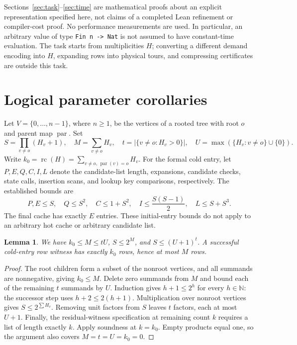 \documentclass[11pt,a4paper]{article}
\newtheorem{lemma}[theorem]{Lemma}
\theoremstyle{definition}
\theoremstyle{remark}
\newcommand{\NN}{\mathbb N}
\newcommand{\pa}{\operatorname{par}}
\newcommand{\RC}{\operatorname{rc}}
\begin{document}
Sections~\ref{sec:task}--\ref{sec:time} are mathematical proofs about an
explicit representation specified here, not claims of a completed Lean
refinement or compiler-cost proof. No performance measurements are used.
In particular, an arbitrary value of type \texttt{Fin n -> Nat} is not
assumed to have constant-time evaluation. The task starts from multiplicities
\(H\); converting a different demand encoding into \(H\), expanding rows
into physical tours, and compressing certificates are outside this task.

\section{Logical parameter corollaries}
Let \(V=\{0,\ldots,n-1\}\), where \(n\ge1\), be the vertices of a rooted
tree with root \(o\) and parent map \(\pa\). Set
\[
 S=\prod_{v\ne o}(H_v+1),\quad M=\sum_{v\ne o}H_v,\quad
 t=|\{v\ne o:H_v>0\}|,\quad
 U=\max(\{H_v:v\ne o\}\cup\{0\}).
\]
Write \(k_0=\RC(H)=\sum_{v\ne o,\,\pa(v)=o}H_v\).
For the formal cold entry, let \(P,E,Q,C,I,L\) denote the candidate-list
length, expansions, candidate checks, state calls, insertion scans, and lookup
key comparisons, respectively. The established bounds are
\begin{equation}\label{eq:logical}
 P,E\le S,\quad Q\le S^2,\quad C\le1+S^2,\quad
 I\le\frac{S(S-1)}2,\quad L\le S+S^3.
\end{equation}
The final cache has exactly \(E\) entries. These initial-entry bounds do not
apply to an arbitrary hot cache or arbitrary candidate list.

\begin{lemma}\label{lem:parameters}
We have \(k_0\le M\le tU\), \(S\le2^M\), and \(S\le(U+1)^t\).
A successful cold-entry row witness has exactly \(k_0\) rows, hence at most
\(M\) rows.
\end{lemma}
\begin{proof}
The root children form a subset of the nonroot vertices, and all summands
are nonnegative, giving \(k_0\le M\). Delete zero summands from \(M\) and
bound each of the remaining \(t\) summands by \(U\).
Induction gives \(h+1\le2^h\) for every \(h\in\NN\): the successor step
uses \(h+2\le2(h+1)\). Multiplication over nonroot vertices gives
\(S\le2^{\sum H_v}\). Removing unit factors from \(S\) leaves \(t\)
factors, each at most \(U+1\). Finally, the residual-witness specification
at remaining count \(k\) requires a list of length exactly \(k\).
Apply soundness at \(k=k_0\). Empty products equal one, so the argument
also covers \(M=t=U=k_0=0\).
\end{proof}
\end{document}
